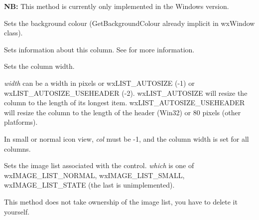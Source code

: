 {\bf NB:} This method is currently only implemented in the Windows version.


\label{wxlistctrlsetbackgroundcolour}


Sets the background colour (GetBackgroundColour already implicit in
wxWindow class).


\label{wxlistctrlsetcolumn}


Sets information about this column. See  for more
information.


\label{wxlistctrlsetcolumnwidth}


Sets the column width.

{\it width} can be a width in pixels or wxLIST\_AUTOSIZE (-1) or wxLIST\_AUTOSIZE\_USEHEADER (-2).
wxLIST\_AUTOSIZE will resize the column to the length of its longest item. wxLIST\_AUTOSIZE\_USEHEADER
will resize the column to the length of the header (Win32) or 80 pixels (other platforms).

In small or normal icon view, {\it col} must be -1, and the column width is set for all columns.


\label{wxlistctrlsetimagelist}


Sets the image list associated with the control. {\it which} is one of
wxIMAGE\_LIST\_NORMAL, wxIMAGE\_LIST\_SMALL, wxIMAGE\_LIST\_STATE (the last is unimplemented).

This method does not take ownership of the image list, you have to
delete it yourself.





\label{wxlistctrlsetitem}



